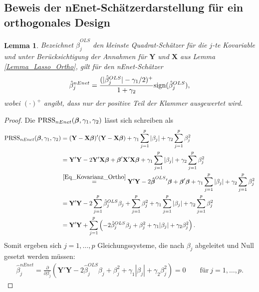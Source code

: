 \documentclass[12pt, a4paper]{report}\usepackage[]{graphicx}\usepackage[]{color}
\newtheorem{lemma}{Lemma}
\begin{document}
\begin{appendix}
\section{Beweis der nEnet-Schätzerdarstellung für ein orthogonales Design}\label{App_nEnet_Orthogonal}
\begin{lemma}
Bezeichnet $\hat{\beta}_j^{OLS}$ den kleinste Quadrat-Schätzer für die $j$-te Kovariable und unter Berücksichtigung der Annahmen für $\mathbf{Y}$ und $\mathbf{X}$ aus Lemma \ref{Lemma_Lasso_Ortho}, gilt für den nEnet-Schätzer
\begin{align*}
\hat{\beta}_j^{nEnet}=\frac{(|\hat{\beta}_j^{OLS}|- \gamma_1 /2)^+}{1+\gamma_2}\textnormal{sign}(\hat{\beta}_j^{OLS}),
\end{align*}
wobei $(\cdot)^+$ angibt, dass nur der positive Teil der Klammer ausgewertet wird.
\end{lemma}
\begin{proof}
Die $\textnormal{PRSS}_{nEnet}(\boldsymbol{\beta}, \gamma_1, \gamma_2)$ lässt sich schreiben als
\begin{align*}
\textnormal{PRSS}_{nEnet}(\boldsymbol{\beta}, \gamma_1, \gamma_2)
&=(\mathbf{Y}-\mathbf{X}\boldsymbol{\beta})'(\mathbf{Y}-\mathbf{X}\boldsymbol{\beta})+ \gamma_1 \sum_{j=1}^{p} |\beta_j| + \gamma_2 \sum_{j=1}^{p} \beta_j^2 \notag \\
&=\mathbf{Y}'\mathbf{Y}-2\mathbf{Y}'\mathbf{X}\boldsymbol{\beta} + \boldsymbol{\beta}'\mathbf{X}'\mathbf{X}\boldsymbol{\beta} + \gamma_1 \sum_{j=1}^{p} |\beta_j| + \gamma_2 \sum_{j=1}^{p} \beta_j^2 \notag \\
&\stackrel{\eqref{Eq_Kovarianz_Ortho}}{=}\mathbf{Y}'\mathbf{Y}-2\boldsymbol{\hat{\beta}}^{OLS}{'}\boldsymbol{\beta} + \boldsymbol{\beta}'\boldsymbol{\beta} + \gamma_1 \sum_{j=1}^{p} |\beta_j| + \gamma_2 \sum_{j=1}^{p} \beta_j^2 \notag \\
&=\mathbf{Y}'\mathbf{Y}-2 \sum_{j=1}^{p}\hat{\beta}_j^{OLS} \beta_j + \sum_{j=1}^{p} \beta_j^2 + \gamma_1 \sum_{j=1}^{p} |\beta_j| + \gamma_2 \sum_{j=1}^{p} \beta_j^2 \notag \\
&=\mathbf{Y}'\mathbf{Y}+\sum_{j=1}^{p}\left( -2 \hat{\beta}_j^{OLS}  \beta_j + \beta_j^2 + \gamma_1 |\beta_j| + \gamma_2 \beta_j^2 \right).
\end{align*}
Somit ergeben sich $j=1,\dots,p$ Gleichungssysteme, die nach $\beta_j$ abgeleitet und Null gesetzt werden müssen:
\begin{align}\label{Eq_nEnet_Einzelbeta}
\hat{\beta}_j^{nEnet}=\frac{\partial}{\partial \beta_j} \left( \mathbf{Y}'\mathbf{Y} -2\hat{\beta}_j^{OLS} \beta_j + \beta_j^2 + \gamma_1 |\beta_j| +\gamma_2 \beta_j^2 \right) =0 \qquad \text{für} \ j=1,\dots,p .

\end{align}
\end{proof}
\end{appendix}
\end{document}
